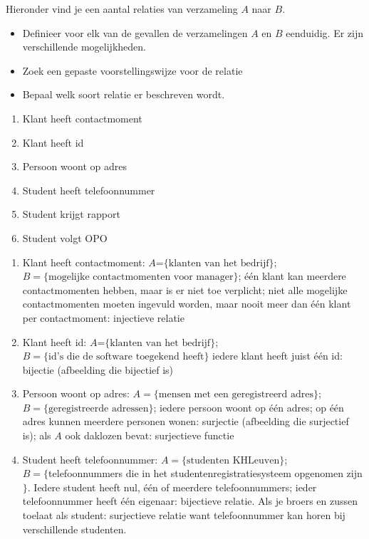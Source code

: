 \begin{oef}
Hieronder vind je een aantal relaties van verzameling $A$ naar $B$. 
\begin{itemize}
\item Definieer voor elk van de gevallen de verzamelingen $A$ en $B$ eenduidig. Er zijn verschillende mogelijkheden.
\item Zoek een gepaste voorstellingswijze voor de relatie
\item Bepaal  welk soort relatie er beschreven wordt.
\end{itemize}
\begin{enumerate}
\item Klant heeft contactmoment
\item Klant heeft id
\item Persoon woont op adres
\item Student heeft telefoonnummer
\item Student krijgt rapport
\item Student volgt OPO
\end{enumerate}
\begin{opl}
\begin{enumerate}

\item Klant heeft contactmoment: $A$=$\{\text{klanten van het bedrijf}\}$; \\
$B=\{\text{mogelijke contactmomenten voor manager}\}$; 
één klant kan meerdere contactmomenten hebben, maar is er niet toe verplicht; 
niet alle mogelijke contactmomenten moeten ingevuld worden, maar nooit meer dan één klant per contactmoment: injectieve relatie

\item Klant heeft id: $A$=$\{\text{klanten van het bedrijf}\}$; \\
$B=\{\text{id's die de software toegekend heeft}\}$ 
iedere klant heeft juist één id: bijectie (afbeelding die bijectief is)

\item Persoon woont op adres: $A=\{\text{mensen met een geregistreerd adres}\}$; \\
$B=\{\text{geregistreerde adressen}\}$; iedere persoon woont op één adres; op één adres kunnen meerdere personen wonen: surjectie (afbeelding die surjectief is); als $A$ ook daklozen bevat: surjectieve functie

\item Student heeft telefoonnummer: $A=\{\text{studenten KHLeuven}\}$; \\
$B=\{$telefoonnummers die in het studentenregistratiesysteem opgenomen zijn$\}$.  Iedere student heeft nul, één of meerdere telefoonnummers; ieder telefoonnummer heeft één eigenaar: bijectieve relatie.
Als je broers en zussen toelaat als student: surjectieve relatie want telefoonnummer kan horen bij verschillende studenten.


\end{enumerate}
\end{opl}
\end{oef}
